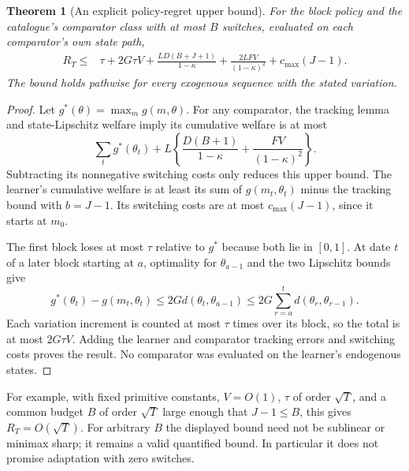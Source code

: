 \documentclass[11pt]{article}
\newtheorem{theorem}{Theorem}
\theoremstyle{definition}
\theoremstyle{remark}
\begin{document}
\begin{theorem}[An explicit policy-regret upper bound]
For the block policy and the catalogue's comparator class with at most $B$ switches, evaluated on each comparator's own state path,
\begin{align*}
 R_T\le{}&\tau+2G\tau V
 +\frac{LD(B+J+1)}{1-\kappa}
 +\frac{2LFV}{(1-\kappa)^2}
 +c_{\max}(J-1).
\end{align*}
The bound holds pathwise for every exogenous sequence with the stated variation.
\end{theorem}
\begin{proof}
Let $g^*(\theta)=\max_mg(m,\theta)$. For any comparator, the tracking lemma and state-Lipschitz welfare imply its cumulative welfare is at most
\[
 \sum_tg^*(\theta_t)+L\left\{\frac{D(B+1)}{1-\kappa}+\frac{FV}{(1-\kappa)^2}\right\}.
\]
Subtracting its nonnegative switching costs only reduces this upper bound. The learner's cumulative welfare is at least its sum of $g(m_t,\theta_t)$ minus the tracking bound with $b=J-1$. Its switching costs are at most $c_{\max}(J-1)$, since it starts at $m_0$.

The first block loses at most $\tau$ relative to $g^*$ because both lie in $[0,1]$. At date $t$ of a later block starting at $a$, optimality for $\theta_{a-1}$ and the two Lipschitz bounds give
\[
 g^*(\theta_t)-g(m_t,\theta_t)
 \le2G d(\theta_t,\theta_{a-1})
 \le2G\sum_{r=a}^t d(\theta_r,\theta_{r-1}).
\]
Each variation increment is counted at most $\tau$ times over its block, so the total is at most $2G\tau V$. Adding the learner and comparator tracking errors and switching costs proves the result. No comparator was evaluated on the learner's endogenous states.
\end{proof}

For example, with fixed primitive constants, $V=O(1)$, $\tau$ of order $\sqrt T$, and a common budget $B$ of order $\sqrt T$ large enough that $J-1\le B$, this gives $R_T=O(\sqrt T)$. For arbitrary $B$ the displayed bound need not be sublinear or minimax sharp; it remains a valid quantified bound. In particular it does not promise adaptation with zero switches.
\end{document}

